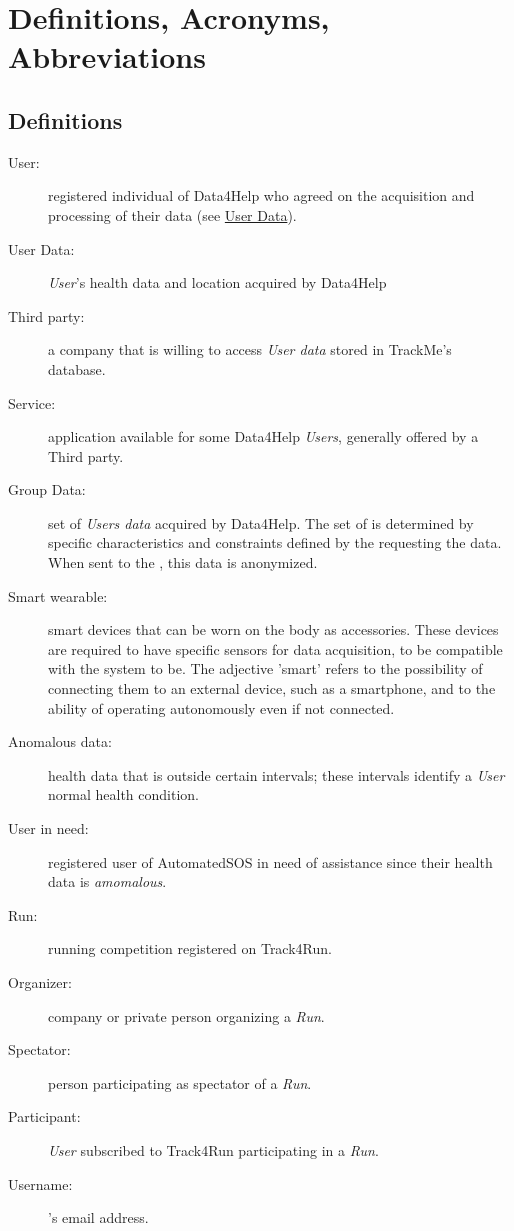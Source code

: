 \documentclass[../../rasd.tex]{subfiles}
\begin{document}
\section{Definitions, Acronyms, Abbreviations}
		\subsection{Definitions}
		\begin{description}
			\item[User:]registered individual of Data4Help who agreed on the acquisition and processing of their data (see \hyperref[def:userdata]{User Data}).
			\item[User Data:\label{def:userdata}]\textit{User}'s health data and location acquired by Data4Help
			\item[Third party:]a company that is willing to access \textit{User data} stored in TrackMe's database.
			\item[Service:]application available for some Data4Help \textit{Users}, generally offered by a Third party.
			\item[Group Data:]set of \textit{Users data} acquired by Data4Help. The set of  is determined by specific characteristics and constraints defined by the  requesting the data. When sent to the , this data is anonymized.
			\item[Smart wearable:]smart devices that can be worn on the body as accessories. These devices are required to have specific sensors for data acquisition, to be compatible with the system to be. The adjective 'smart' refers to the possibility of connecting them to an external device, such as a smartphone, and to the ability of operating autonomously even if not connected.
			\item[Anomalous data:]health data that is outside certain intervals; these intervals identify a \textit{User} normal health condition.
			\item[User in need:]registered user of AutomatedSOS in need of assistance since their health data is \textit{amomalous}.
			\item[Run:]running competition registered on Track4Run. 
			\item[Organizer:]company or private person organizing a \textit{Run}.
			\item[Spectator:]person participating as spectator of a \textit{Run}.
			\item[Participant:]\textit{User} subscribed to Track4Run participating in a \textit{Run}.
			\item[Username:]'s email address.
			
			


		\end{description}
\end{document}
